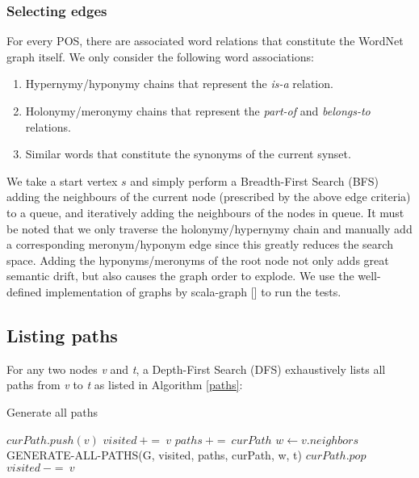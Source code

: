 \subsubsection{Selecting edges}
For every POS, there are associated word relations that constitute the WordNet graph itself. We 
only consider the following word associations: 

\begin{enumerate}
\item Hypernymy/hyponymy chains that represent the \emph{is-a} relation.
\item Holonymy/meronymy chains that represent the \emph{part-of} and \emph{belongs-to} relations.
\item Similar words that constitute the synonyms of the current synset.
\end{enumerate}

We take a start vertex $s$ and simply perform a Breadth-First Search (BFS) adding the neighbours of
the current node (prescribed by the above edge criteria) to a queue, and iteratively adding the
neighbours of the nodes in queue. It must be noted that we only traverse the holonymy/hypernymy
chain and manually add a corresponding meronym/hyponym edge since this greatly reduces the search
space. Adding the hyponyms/meronyms of the root node not only adds great semantic drift, but 
also causes the graph order to explode. We use the well-defined implementation of graphs by
scala-graph [\cite{scala-graph}] to run the tests.

\subsection{Listing paths}
For any two nodes \emph{v} and \emph{t}, a Depth-First Search (DFS) exhaustively lists
all paths from \emph{v} to \emph{t} as listed in Algorithm \ref{paths}:

\begin{algorithm}
\caption{Generate all paths}\label{paths}
  \begin{algorithmic}[1]
    \State $curPath.push(v)$
    \State $visited\ +=\ v$
      \State $paths\ +=\ curPath$
      \Else 
        \State $w \gets v.neighbors$
            \State GENERATE-ALL-PATHS(G, visited, paths, curPath, w, t)
          \EndIf
    \EndIf
    \State $curPath.pop$
    \State $visited\ -=\ v$
    \EndProcedure
  \end{algorithmic}
\end{algorithm}

